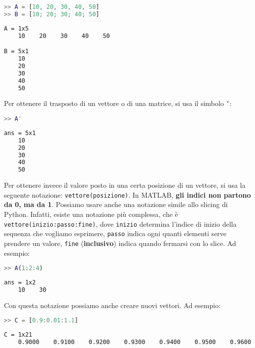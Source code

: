 \begin{terminal}
    \begin{lstlisting}[language=MATLAB, style=notexterm]
>> A = [10, 20, 30, 40, 50]
>> B = [10; 20; 30; 40; 50]\end{lstlisting}
    \tcblower
    \begin{lstlisting}[style=notexterm, language = tex]
A = 1x5
    10    20    30    40    50

B = 5x1
    10
    20
    30
    40
    50\end{lstlisting}
\end{terminal}

Per ottenere il trasposto di un vettore o di una matrice, si usa il simbolo \texttt{'}:

\begin{terminal}
    \begin{lstlisting}[language=MATLAB, style=notexterm]
>> A'\end{lstlisting}
    \tcblower
    \begin{lstlisting}[style=notexterm, language = tex]
ans = 5x1
    10
    20
    30
    40
    50\end{lstlisting}
\end{terminal}

Per ottenere invece il valore posto in una certa posizione di un vettore, si usa la seguente notazione: \texttt{vettore(posizione)}. In MATLAB, \textbf{gli indici non partono da 0, ma da 1}. Possiamo usare anche una notazione simile allo slicing di Python. Infatti, esiste una notazione più complessa, che è \texttt{vettore(inizio:passo:fine)}, dove \texttt{inizio} determina l'indice di inizio della sequenza che vogliamo esprimere, \texttt{passo} indica ogni quanti elementi serve prendere un valore, \texttt{fine} (\textbf{inclusivo}) indica quando fermarsi con lo slice. Ad esempio:

\begin{terminal}
    \begin{lstlisting}[language=MATLAB, style=notexterm]
>> A(1:2:4)\end{lstlisting}
    \tcblower
    \begin{lstlisting}[style=notexterm, language = tex]
ans = 1x2
    10    30\end{lstlisting}
\end{terminal}

Con questa notazione possiamo anche creare nuovi vettori. Ad esempio:

\begin{terminal}
    \begin{lstlisting}[language=MATLAB, style=notexterm]
>> C = [0.9:0.01:1.1]\end{lstlisting}
    \tcblower
    \begin{lstlisting}[style=notexterm, language = tex]
C = 1x21
    0.9000    0.9100    0.9200    0.9300    0.9400    0.9500    0.9600    0.9700    0.9800    0.9900    1.0000    1.0100    1.0200    1.0300    1.0400    1.0500    1.0600    1.0700    1.0800    1.0900    1.1000\end{lstlisting}
\end{terminal}

